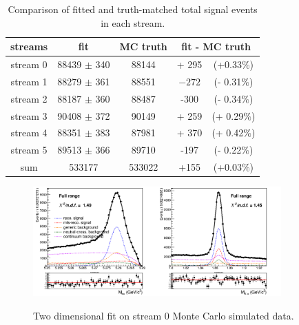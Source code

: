 \vspace{0.5 cm}
\begin{table}[H]
\centering
\begin{tabular}{c c c c c}%
 \hline
  streams   &  fit  & MC truth  &\multicolumn{2}{c}{fit - MC truth}  \\
 \hline
 stream 0 &  88439  $\pm$ 340  & 88144  & + 295 & (+0.33$\%$)  \\
 stream 1 &  88279 $\pm$ 361 & 88551 & $ - 272$ & (- 0.31$\%$)\\
 stream 2  & 88187 $\pm$ 360 &  88487 & -300 & (- 0.34$\%$)  \\
  stream 3  & 90408 $\pm$ 372 &  90149  &   + 259 & (+ 0.29$\%$) \\
   stream 4  & 88351 $\pm$ 383 &  87981  &  + 370 & (+ 0.42$\%$) \\
stream 5  & 89513 $\pm$ 366 &  89710  &  -197 & (- 0.22$\%$) \\
    \hline
     sum  & 533177  &  533022  & +155 & (+0.03$\%$)  \\  
 \hline 
\end{tabular}
\caption{Comparison of fitted and truth-matched total signal events in each stream.}\label{tab:5streams_chargedTotalSignalYields}
\end{table}


\begin{figure}[H]
\centering
{\includegraphics[width=0.85\textwidth]{05-chargedControlSample/figs/stream0_chargedControlD0_Total_2DFit.png}}
\caption{Two dimensional fit on stream 0 Monte Carlo simulated data.}
\label{fig:stream0_chargedControlD0_Total_2DFit}
\end{figure}

